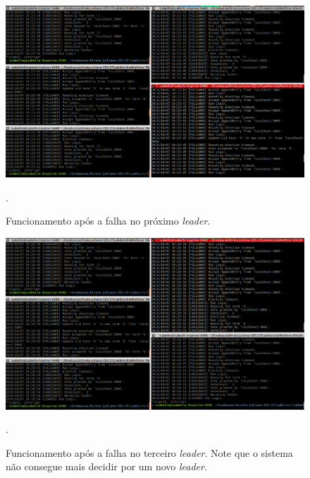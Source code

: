 \documentclass[journal,onecolumn]{IEEEtran}
\begin{document}
\begin{figure}[H]
\centering
\centerline{\includegraphics[scale=0.4]{imagens/2_falhas.png}}
\caption{Funcionamento após a falha no próximo \textit{leader}.}.
\label{2_falhas}
\end{figure}

\begin{figure}[H]
\centering
\centerline{\includegraphics[scale=0.4]{imagens/3_falhas.png}}
\caption{Funcionamento após a falha no terceiro \textit{leader}. Note que o sistema não consegue mais decidir por um novo \textit{leader}.}.
\label{3_falhas}
\end{figure}
\end{document}
